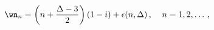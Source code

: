 \begin{equation}
\wn_n = \left( n + {\Delta -3\over 2} \right) \left( 1-i \right)
+\epsilon (n,\Delta)\,, \;\;\;\; n=1,2,\dots \,,
\label{scalar_spectrum}
\end{equation}

